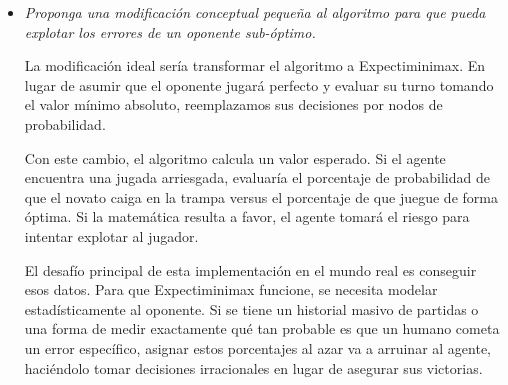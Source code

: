 \documentclass[11pt]{article}
\begin{document}
\begin{itemize}[leftmargin=*, itemsep=0.8em]
	\item \textit{Proponga una modificación conceptual pequeña al algoritmo para que pueda explotar los errores
		      de un oponente sub-óptimo.}

	      La modificación ideal sería transformar el algoritmo a Expectiminimax. En lugar de asumir que el oponente jugará
	      perfecto y evaluar su turno tomando el valor mínimo absoluto, reemplazamos sus decisiones por nodos de probabilidad.

	      Con este cambio, el algoritmo calcula un valor esperado. Si el agente encuentra una jugada arriesgada, evaluaría el
	      porcentaje de probabilidad de que el novato caiga en la trampa versus el porcentaje de que juegue de forma óptima.
	      Si la matemática resulta a favor, el agente tomará el riesgo para intentar explotar al jugador.

	      El desafío principal de esta implementación en el mundo real es conseguir esos datos. Para que Expectiminimax funcione,
	      se necesita modelar estadísticamente al oponente. Si se tiene un historial masivo de partidas o una forma de medir
	      exactamente qué tan probable es que un humano cometa un error específico, asignar estos porcentajes al azar va a
	      arruinar al agente, haciéndolo tomar decisiones irracionales en lugar de asegurar sus victorias.

\end{itemize}
\end{document}
